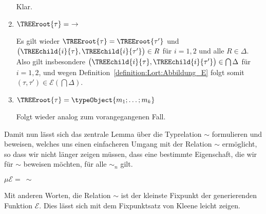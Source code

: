 \begin{beweis}
\begin{enumerate}
                  Klar.

            \item $\TREEroot{\tau} =\ \to$

                  Es gilt wieder $\TREEroot{\tau} = \TREEroot{\tau'}$ und
                  $\bigl(\TREEchild{i}{\tau},\TREEchild{i}{\tau'}\bigr)\in{R}$ f\"ur $i=1,2$ und alle $R\in\Delta$.
                  Also gilt insbesondere $\bigl(\TREEchild{i}{\tau},\TREEchild{i}{\tau'}\bigr)\in\bigcap\Delta$ f\"ur $i=1,2$,
                  und wegen Definition~\ref{definition:Lort:Abbildung_E} folgt somit $(\tau,\tau')\in\mathcal{E}(\bigcap\Delta)$.
            
            \item $\TREEroot{\tau} = \typeObject{m_1;\ldots;m_k}$

                  Folgt wieder analog zum vorangegangenen Fall.
          \PROOFCASEend
  \end{enumerate}
\end{beweis}
%
Damit nun l\"asst sich das zentrale Lemma \"uber die Typrelation $\sim$ formulieren und beweisen,
welches uns einen einfacheren Umgang mit der Relation $\sim$ erm\"oglicht, so dass wir nicht
l\"anger zeigen m\"ussen, dass eine bestimmte Eigenschaft, die wir f\"ur $\sim$ beweisen m\"ochten,
f\"ur alle $\sim_n$ gilt.

\begin{lemma} \label{lemma:Lort:Fixpunkt_Lemma}
  $\mu\mathcal{E} =\ \sim$
\end{lemma}

Mit anderen Worten, die Relation $\sim$ ist der kleinste Fixpunkt der generierenden Funktion $\mathcal{E}$.
Dies l\"asst sich mit dem Fixpunktsatz von Kleene leicht zeigen.

